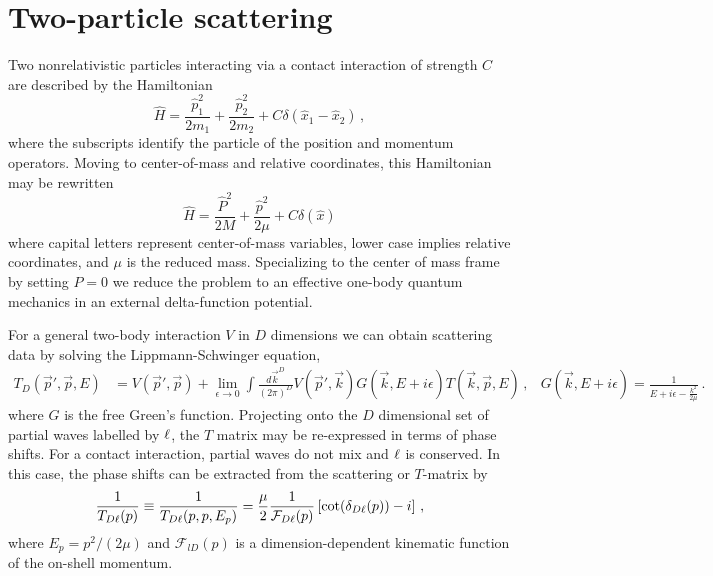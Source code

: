 \section{Two-particle scattering}

Two nonrelativistic particles interacting via a contact interaction of strength $C$ are described by the Hamiltonian
\begin{equation}
    \label{eq:particle hamiltonian}
    \hat H = \frac{\hat p_1^2}{2 m_1} + \frac{\hat p_2^2}{2 m_2} + C \delta(\hat x_1 - \hat x_2)
    \,,
\end{equation}
where the subscripts identify the particle of the position and momentum operators.
Moving to center-of-mass and relative coordinates, this Hamiltonian may be rewritten
\begin{equation}
    \label{eq:hamiltonian}
    \hat H = \frac{\hat P^2}{2 M} + \frac{\hat p^2}{2 \mu} + C \delta(\hat x)
\end{equation}
where capital letters represent center-of-mass variables, lower case implies relative coordinates, and $\mu$ is the reduced mass.
Specializing to the center of mass frame by setting $P=0$ we reduce the problem to an effective one-body quantum mechanics in an external delta-function potential.

For a general two-body interaction $V$ in $D$ dimensions we can obtain scattering data by solving the Lippmann-Schwinger equation,
\begin{align}
	T_D(\vec p', \vec p, E)
	&=
	V(\vec p', \vec p) + \lim\limits_{\epsilon \to 0}\int \frac{d \vec k^D}{(2\pi)^D} V(\vec p', \vec k) G(\vec k, E + i \epsilon) T(\vec k, \vec p, E) \, ,
	&
	G(\vec k, E+ i \epsilon) = \frac{1}{E + i \epsilon - \frac{k^2}{2\mu}}
	\, .
\end{align}
where $G$ is the free Green's function.
Projecting onto the $D$ dimensional set of partial waves labelled by $\ell$, the $T$ matrix may be re-expressed in terms of phase shifts.
For a contact interaction, partial waves do not mix and $\ell$ is conserved.
In this case, the phase shifts can be extracted from the scattering or $T$-matrix by
\begin{align}\label{eq:on-shell-T}
	\frac{1}{T_{D\ell}(p)}
    \equiv
    \frac{1}{T_{D\ell}(p, p, E_p)}
    = \frac{\mu}{2}
    \frac{1}{\mathcal F_{D\ell}(p)} \left[\cot (\delta_{D\ell}(p)) - i\right] \, ,
\end{align}
where $E_p = p^2 / (2 \mu)$ and $\mathcal F_{l D}(p)$ is a dimension-dependent kinematic function of the on-shell momentum.

